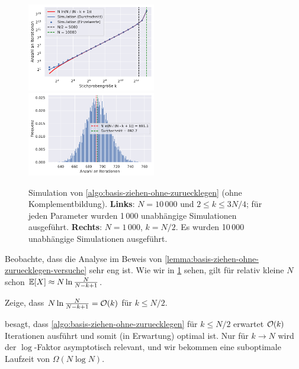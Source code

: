 \noindent
\begin{figure}
    \begin{center}
        \includegraphics[width=0.5\textwidth]{data/gnm_iterationen.pdf}%
        \hfil
        \includegraphics[width=0.5\textwidth]{data/gnm_iterationen_hist.pdf}
    \end{center}
    \caption{Simulation von \cref{algo:basis-ziehen-ohne-zuruecklegen} (ohne Komplementbildung).
        \textbf{Links}: $N=10\,000$ und $2 \le k \le 3N/4$; für jeden Parameter wurden 1\,000 unabhängige Simulationen ausgeführt.
        \textbf{Rechts}: $N=1\,000$, $k = N/2$. Es wurden 10\,000 unabhängige Simulationen ausgeführt.
    }
    \label{fig:ziehen-ohne-zuruecklegen-iterationen}
\end{figure}

\vspace{-3ex}
Beobachte, dass die Analyse im Beweis von \cref{lemma:basis-ziehen-ohne-zuruecklegen-versuche} sehr eng ist.
Wie wir in \cref{fig:ziehen-ohne-zuruecklegen-iterationen} sehen, gilt für relativ kleine $N$ schon $\mathbb{E}\!\left[X\right] \approx N \ln \frac{N}{N - k + 1}$.

\begin{exercise}
    Zeige, dass $N \ln \frac{N}{N - k + 1} = \mathcal{O}\!\left(k\right)$ für $k \le N / 2$.
\end{exercise}

\bigskip

 besagt, dass \cref{algo:basis-ziehen-ohne-zuruecklegen} für $k \le N / 2$ erwartet $\mathcal{O}\!\left(k\right)$ Iterationen ausführt und somit (in Erwartung) optimal ist.
Nur für $k \to N$ wird der $\log$-Faktor asymptotisch relevant, und wir bekommen eine suboptimale Laufzeit von $\Omega(N \log N)$.

